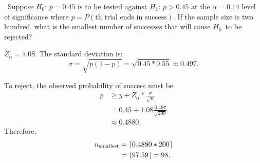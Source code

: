 \begin{problem}
  ~Suppose $H_0$: ${p=0.45}$ is to be tested against $H_1$: ${p > 0.45}$ at the ${\alpha = 0.14}$ level of significance where ${p = P(\text{th trial ends in success})}$. If the sample size is two hundred, what is the smallest number of successes that will cause $H_0$~to be rejected?
\end{problem}

\noindent
${Z_{\alpha} = 1.08}$.  The standard deviation is:
\begin{equation*}
  \sigma = \sqrt{p(1-p)} = \sqrt{0.45 * 0.55} \approx 0.497\text{.}
\end{equation*}

\noindent
To reject, the observed probability of success must be
\begin{align*}
  \bar{p} &\geq y + Z_{\alpha} * \frac{\sigma}{\sqrt{n}} \\
          &= 0.45 + 1.08 \frac{0.497}{\sqrt{200}} \\
          &\approx 0.4880 \text{.}
\end{align*}
Therefore,
\begin{align*}
  n_{\text{smallest}} &= \lceil0.4880 * 200\rceil \\
                      &= \lceil97.59\rceil = 98\text{.}
\end{align*}
